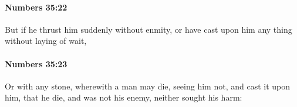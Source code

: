 		\paragraph{Numbers 35:22} %
			\label{NUMBERS-35-22}

			But if he thrust him suddenly without enmity, or have cast upon him any thing without laying of wait,


		\paragraph{Numbers 35:23} %
			\label{NUMBERS-35-23}

			Or with any stone, wherewith a man may die, seeing him not, and cast it upon him, that he die, and was not his enemy, neither sought his harm:


